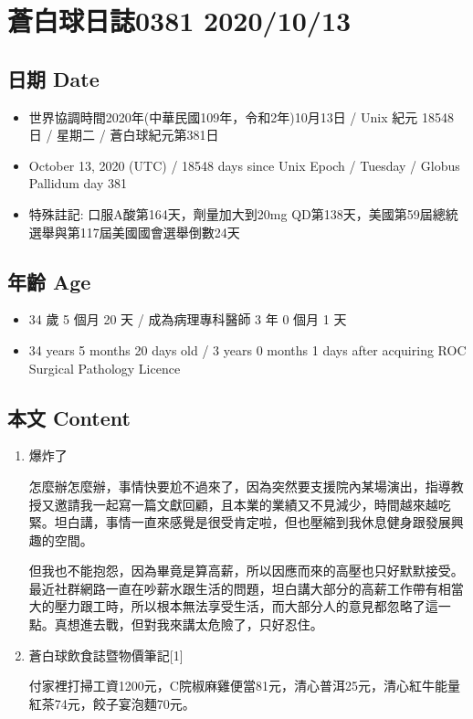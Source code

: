 \documentclass[
]{article}
\providecommand{\tightlist}{%
  \setlength{\itemsep}{0pt}\setlength{\parskip}{0pt}}
\begin{document}
\hypertarget{ux84bcux767dux7403ux65e5ux8a8c0381-20201013}{%
\section{蒼白球日誌0381
2020/10/13}\label{ux84bcux767dux7403ux65e5ux8a8c0381-20201013}}

\hypertarget{ux65e5ux671f-date-11}{%
\subsection{日期 Date}\label{ux65e5ux671f-date-11}}

\begin{itemize}
\tightlist
\item
  世界協調時間2020年(中華民國109年，令和2年)10月13日 / Unix 紀元 18548
  日 / 星期二 / 蒼白球紀元第381日
\item
  October 13, 2020 (UTC) / 18548 days since Unix Epoch / Tuesday /
  Globus Pallidum day 381
\item
  特殊註記: 口服A酸第164天，劑量加大到20mg
  QD第138天，美國第59屆總統選舉與第117屆美國國會選舉倒數24天
\end{itemize}

\hypertarget{ux5e74ux9f61-age-11}{%
\subsection{年齡 Age}\label{ux5e74ux9f61-age-11}}

\begin{itemize}
\tightlist
\item
  34 歲 5 個月 20 天 / 成為病理專科醫師 3 年 0 個月 1 天
\item
  34 years 5 months 20 days old / 3 years 0 months 1 days after
  acquiring ROC Surgical Pathology Licence
\end{itemize}

\hypertarget{ux672cux6587-content-11}{%
\subsection{本文 Content}\label{ux672cux6587-content-11}}

\begin{enumerate}
\def\labelenumi{\arabic{enumi}.}
\item
  爆炸了

  怎麼辦怎麼辦，事情快要尬不過來了，因為突然要支援院內某場演出，指導教授又邀請我一起寫一篇文獻回顧，且本業的業績又不見減少，時間越來越吃緊。坦白講，事情一直來感覺是很受肯定啦，但也壓縮到我休息健身跟發展興趣的空間。

  但我也不能抱怨，因為畢竟是算高薪，所以因應而來的高壓也只好默默接受。最近社群網路一直在吵薪水跟生活的問題，坦白講大部分的高薪工作帶有相當大的壓力跟工時，所以根本無法享受生活，而大部分人的意見都忽略了這一點。真想進去戰，但對我來講太危險了，只好忍住。
\item
  蒼白球飲食誌暨物價筆記{[}1{]}

  付家裡打掃工資1200元，C院椒麻雞便當81元，清心普洱25元，清心紅牛能量紅茶74元，餃子宴泡麵70元。
\end{enumerate}
\end{document}
